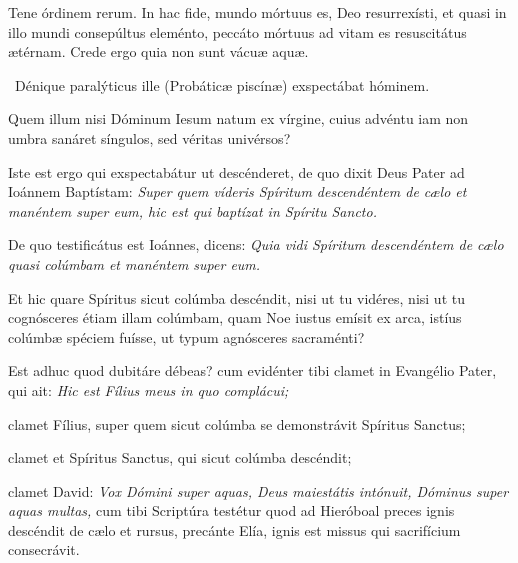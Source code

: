 {\noindent Tene órdinem rerum. In hac fide, mundo mórtuus es, Deo resurrexísti, et quasi in illo mundi consepúltus eleménto, peccáto mórtuus ad vitam es resuscitátus ætérnam. Crede ergo quia non sunt vácuæ aquæ.

\noindent Dénique paralýticus ille (Probáticæ piscínæ) exspectábat hóminem.

\noindent Quem illum nisi Dóminum Iesum natum ex vírgine, cuius advéntu iam non umbra sanáret síngulos, sed véritas univérsos?

\noindent Iste est ergo qui exspectabátur ut descénderet, de quo dixit Deus Pater ad Ioánnem Baptístam: \emph{Super quem víderis Spíritum descendéntem de cælo et manéntem super eum, hic est qui baptízat in Spíritu Sancto.}

\noindent De quo testificátus est Ioánnes, dicens: \emph{Quia vidi Spíritum descendéntem de cælo quasi colúmbam et manéntem super eum.}

\noindent Et hic quare Spíritus sicut colúmba descéndit, nisi ut tu vidéres, nisi ut tu cognósceres étiam illam colúmbam, quam Noe iustus emísit ex arca, istíus colúmbæ spéciem fuísse, ut typum agnósceres sacraménti?

\noindent Est adhuc quod dubitáre débeas? cum evidénter tibi clamet in Evangélio Pater, qui ait: \emph{Hic est Fílius meus in quo complácui;}

\noindent clamet Fílius, super quem sicut colúmba se demonstrávit Spíritus Sanctus;

\noindent clamet et Spíritus Sanctus, qui sicut colúmba descéndit;

\noindent clamet David: \emph{Vox Dómini super aquas, Deus maiestátis intónuit, Dóminus super aquas multas,} cum tibi Scriptúra testétur quod ad Hieróboal preces ignis descéndit de cælo et rursus, precánte Elía, ignis est missus qui sacrifícium consecrávit.

}

